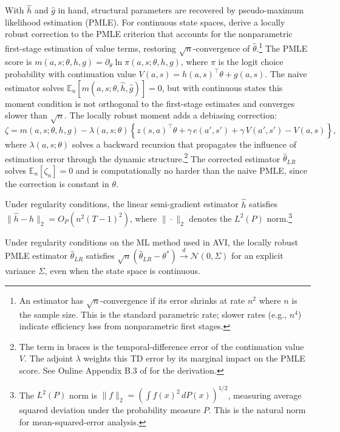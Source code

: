 With $\hat{h}$ and $\hat{g}$ in hand, structural parameters are recovered by pseudo-maximum likelihood estimation (PMLE). For continuous state spaces, \citet{AdusumilliEckardt2022} derive a locally robust correction to the PMLE criterion that accounts for the nonparametric first-stage estimation of value terms, restoring $\sqrt{n}$-convergence of $\hat{\theta}$.\footnote{An estimator has $\sqrt{n}$-convergence if its error shrinks at rate $n^{2}$ where $n$ is the sample size. This is the standard parametric rate; slower rates (e.g., $n^{4}$) indicate efficiency loss from nonparametric first stages.} The PMLE score is $m(a,s;\theta,h,g) = \partial_\theta \ln \pi(a,s;\theta,h,g)$, where $\pi$ is the logit choice probability with continuation value $V(a,s) = h(a,s)^\top \theta + g(a,s)$. The naive estimator solves $\mathbb{E}_n[m(a,s;\theta,\hat{h},\hat{g})] = 0$, but with continuous states this moment condition is not orthogonal to the first-stage estimates and converges slower than $\sqrt{n}$. The locally robust moment adds a debiasing correction:
\begin{equation}
\zeta = m(a,s;\theta,h,g) - \lambda(a,s;\theta)\left\{z(s,a)^\top \theta + \gamma \, e(a',s') + \gamma \, V(a',s') - V(a,s)\right\},
\label{eq:ae_robust}
\end{equation}
where $\lambda(a,s;\theta)$ solves a backward recursion that propagates the influence of estimation error through the dynamic structure.\footnote{The term in braces is the temporal-difference error of the continuation value $V$. The adjoint $\lambda$ weights this TD error by its marginal impact on the PMLE score. See Online Appendix B.3 of \citet{AdusumilliEckardt2022} for the derivation.} The corrected estimator $\hat{\theta}_{LR}$ solves $\mathbb{E}_n[\zeta_n] = 0$ and is computationally no harder than the naive PMLE, since the correction is constant in $\theta$.

\begin{theorem}
Under regularity conditions, the linear semi-gradient estimator $\hat{h}$ satisfies $\|\hat{h} - h\|_2 = O_P(n^{2}(T-1)^{2})$, where $\|\cdot\|_2$ denotes the $L^2(P)$ norm.\footnote{The $L^2(P)$ norm is $\|f\|_2 = (\int f(x)^2 \, dP(x))^{1/2}$, measuring average squared deviation under the probability measure $P$. This is the natural norm for mean-squared-error analysis.}
\end{theorem}

\begin{theorem}
Under regularity conditions on the ML method used in AVI, the locally robust PMLE estimator $\hat{\theta}_{LR}$ satisfies $\sqrt{n}(\hat{\theta}_{LR} - \theta^*) \xrightarrow{d} \mathcal{N}(0, \Sigma)$ for an explicit variance $\Sigma$, even when the state space is continuous.
\end{theorem}

